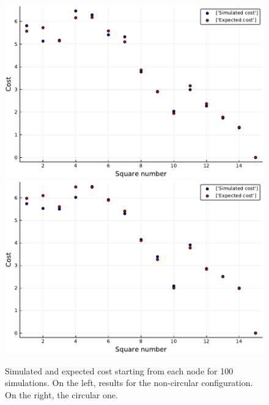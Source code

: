 \begin{figure}[H]
\centering
\includegraphics[scale=0.41]{../img/board_magic/cost_per_square_100_iter_noncirc.pdf}
\includegraphics[scale=0.41]{../img/board_magic/cost_per_square_100_iter_circ.pdf}
\caption{Simulated and expected cost starting from each node for 100 simulations. On the left, results for the non-circular configuration. On the right, the circular one.}
\label{fig:cost_per_square_100_iter_magic}
\end{figure}

